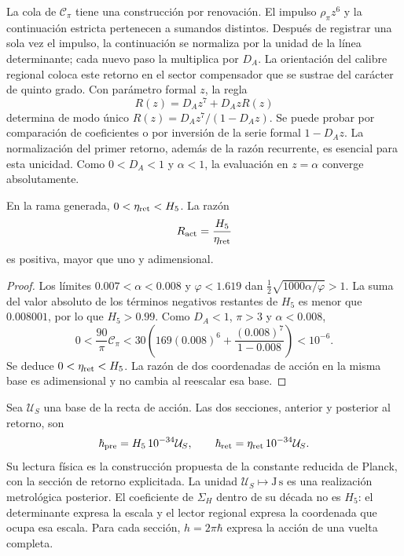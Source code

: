 La cola de \(\mathcal C_\pi\) tiene una construcción por renovación.
El impulso \(\rho_\pi z^6\) y la continuación estricta pertenecen
a sumandos distintos. Después de registrar una sola vez el impulso,
la continuación se normaliza por la unidad de la línea determinante;
cada nuevo paso la multiplica por \(D_A\). La orientación del
calibre regional coloca este retorno en el sector compensador que
se sustrae del carácter de quinto grado.
Con parámetro formal \(z\), la regla
\begin{equation}
 R(z)=D_Az^7+D_AzR(z)
 \label{vi:dep:renovacion}
\end{equation}
determina de modo único
\(R(z)=D_Az^7/(1-D_Az)\). Se puede probar por comparación de
coeficientes o por inversión de la serie formal \(1-D_Az\).
La normalización del primer retorno, además de la razón recurrente,
es esencial para esta unicidad. Como \(0<D_A<1\) y \(\alpha<1\),
la evaluación en \(z=\alpha\) converge absolutamente.

\begin{proposition}
\label{vi:dep:positividad-accion}
En la rama generada, \(0<\eta_{\rm ret}<H_5\). La razón
\begin{equation}
 R_{\rm act}=\frac{H_5}{\eta_{\rm ret}}
 \label{vi:dep:Ract}
\end{equation}
es positiva, mayor que uno y adimensional.
\end{proposition}
\begin{proof}
Los límites \(0.007<\alpha<0.008\) y \(\varphi<1.619\) dan
\(\tfrac12\sqrt{1000\alpha/\varphi}>1\). La suma del valor absoluto
de los términos negativos restantes de \(H_5\) es menor que
\(0.008001\), por lo que \(H_5>0.99\).
Como \(D_A<1\), \(\pi>3\) y \(\alpha<0.008\),
\[
 0<\frac{90}{\pi}\mathcal C_\pi
 <30\left(169(0.008)^6+
                  \frac{(0.008)^7}{1-0.008}\right)<10^{-6}.
\]
Se deduce \(0<\eta_{\rm ret}<H_5\). La razón de dos coordenadas
de acción en la misma base es adimensional y no cambia al reescalar
esa base.
\end{proof}

Sea \(\mathcal U_S\) una base de la recta de acción. Las dos
secciones, anterior y posterior al retorno, son
\begin{equation}
 \hbar_{\rm pre}=H_5\,10^{-34}\mathcal U_S,
 \qquad
 \hbar_{\rm ret}=\eta_{\rm ret}\,10^{-34}\mathcal U_S.
 \label{vi:dep:hbar}
\end{equation}
Su lectura física es la construcción propuesta de la constante reducida
de Planck, con la sección de retorno explicitada. La unidad
\(\mathcal U_S\mapsto\mathrm{J\,s}\) es una realización metrológica
posterior. El coeficiente de \(\Sigma_H\) dentro de su década no es
\(H_5\): el determinante expresa la escala y el lector regional
expresa la coordenada que ocupa esa escala. Para cada sección,
\(h=2\pi\hbar\) expresa la acción de una vuelta completa.

